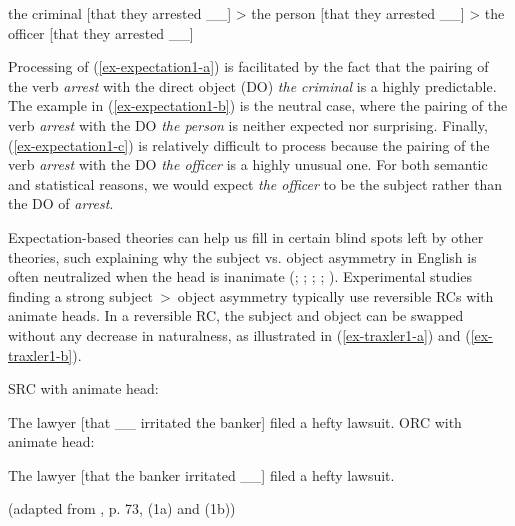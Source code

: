 \pex \label{ex-expectation1}
\a the criminal [that they arrested \_\_] > \label{ex-expectation1-a}
\a the person [that they arrested \_\_] > \label{ex-expectation1-b}
\a the officer [that they arrested \_\_] \label{ex-expectation1-c}
\xe 

\noindent Processing of (\ref{ex-expectation1-a}) is facilitated by the fact that the pairing of the verb \textit{arrest} with the direct object (DO) \textit{the criminal} is a highly predictable. The example in (\ref{ex-expectation1-b}) is the neutral case, where the pairing of the verb \textit{arrest} with the DO \textit{the person} is neither expected nor surprising. Finally, (\ref{ex-expectation1-c}) is relatively difficult to process because the pairing of the verb \textit{arrest} with the DO \textit{the officer} is a highly unusual one. For both semantic and statistical reasons, we would expect \textit{the officer} to be the subject rather than the DO of \textit{arrest}.

Expectation-based theories can help us fill in certain blind spots left by other theories, such explaining why the subject vs. object asymmetry in English is often  neutralized when the head is inanimate (\cite{gordon.etal2001,gordon.etal2002}; \cite{mak2001}; \cite{mak.etal2006,mak.etal2002}; \cite{reali.christiansen2007}; \cite{traxler.etal2005}). Experimental studies finding a strong subject~>~object asymmetry typically use reversible RCs with animate heads. In a reversible RC, the subject and object can be swapped without any decrease in naturalness, as illustrated in (\ref{ex-traxler1-a}) and (\ref{ex-traxler1-b}). 

\pex \label{ex-traxler1}
\a SRC with animate head: \par\nobreak\vspace{5pt}
The lawyer [that \_\_ irritated the banker] filed a hefty lawsuit. \label{ex-traxler1-a}
\a ORC with animate head: \par\nobreak\vspace{5pt}
The lawyer [that the banker irritated \_\_] filed a hefty lawsuit. \label{ex-traxler1-b}
\par\nobreak\vspace{5pt}
\hfill (adapted from \cite{traxler.etal2002}, p. 73, (1a) and (1b))
\xe

